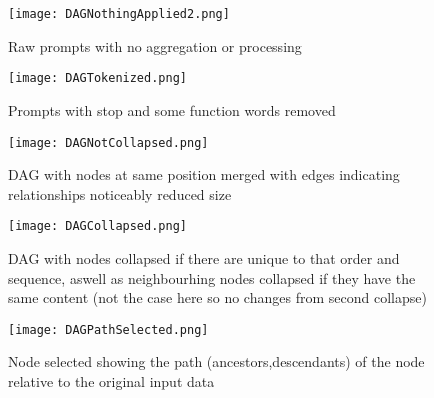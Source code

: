 \documentclass[
  a4paper,  %
  twoside,  %
  bibliography=totoc,
  headsepline,
  cleardoublepage=empty,
  parskip=half,
  draft=false
]{scrbook}
\begin{document}
\begin{figure}[H]        %
	\centering           %
	\texttt{[image: DAGNothingApplied2.png]}
	\caption{Raw prompts with no aggregation or processing}
	\label{fig:dagPure}  %
\end{figure}
\begin{figure}[H]        %
	\centering           %
	\texttt{[image: DAGTokenized.png]}
	\caption{Prompts with stop and some function words removed}
	\label{fig:dagTokenized}  %
\end{figure}
\begin{figure}[H]
	\centering
	\texttt{[image: DAGNotCollapsed.png]}
	\caption{DAG with nodes at same position merged with edges indicating relationships noticeably reduced size }
	\label{fig:dagMerged}
\end{figure}
\begin{figure}[H]
	\centering
	\texttt{[image: DAGCollapsed.png]}
	\caption{DAG with nodes collapsed if there are unique to that order and sequence, aswell as neighbourhing nodes collapsed if they have the same content (not the case here so no changes from second collapse)}
	\label{fig:dagCollapsed}
\end{figure}
\begin{figure}[H]
	\centering
	\texttt{[image: DAGPathSelected.png]}
	\caption{Node selected showing the path (ancestors,descendants) of the node relative to the original input data}
	\label{dagPath}
\end{figure}
\end{document}
